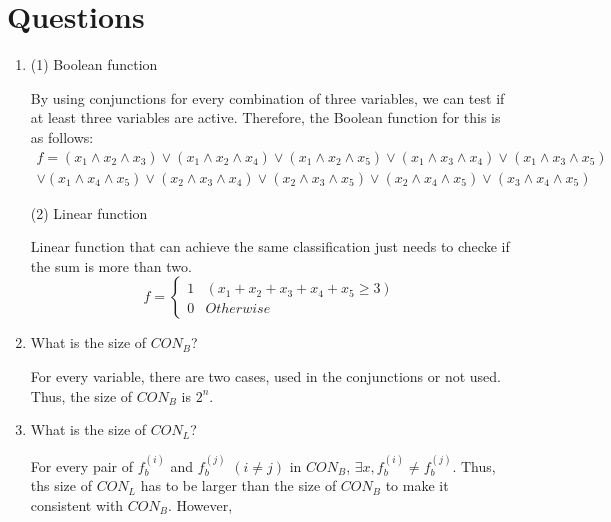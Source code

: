 

\oddsidemargin 0in
\evensidemargin 0in
\textwidth 6.5in
\topmargin -0.5in
\textheight 9.0in




\pagestyle{myheadings}  %

\section{Questions}

\begin{enumerate}
\item 
(1) Boolean function

By using conjunctions for every combination of three variables, we can test if at least three variables are active. Therefore, the Boolean function for this is as follows:
\begin{eqnarray*}
f=(x_1 \wedge x_2 \wedge x_3) \vee (x_1 \wedge x_2 \wedge x_4) \vee (x_1 \wedge x_2 \wedge x_5) \vee (x_1 \wedge x_3 \wedge x_4) \vee (x_1 \wedge x_3 \wedge x_5) \\
\vee (x_1 \wedge x_4 \wedge x_5) \vee (x_2 \wedge x_3 \wedge x_4) \vee (x_2 \wedge x_3 \wedge x_5) \vee (x_2 \wedge x_4 \wedge x_5) \vee (x_3 \wedge x_4 \wedge x_5)
\end{eqnarray*}

(2) Linear function

Linear function that can achieve the same classification just needs to checke if the sum is more than two.
\[
f = \begin{cases}
1 & (x_1 + x_2 + x_3 + x_4 + x_5 \geq 3) \\
0 & Otherwise
\end{cases}
\]


\item What is the size of $CON_B$?

For every variable, there are two cases, used in the conjunctions or not used. Thus, the size of $CON_B$ is $2^n$. 

\item What is the size of $CON_L$?

For every pair of $f_b^{(i)}$ and $f_b^{(j)}$ $(i \neq j)$ in $CON_B$, $\exists x, f_b^{(i)} \neq f_b^{(j)}$. Thus, ths size of $CON_L$ has to be larger than the size of $CON_B$ to make it consistent with $CON_B$. However, 


\end{enumerate}
